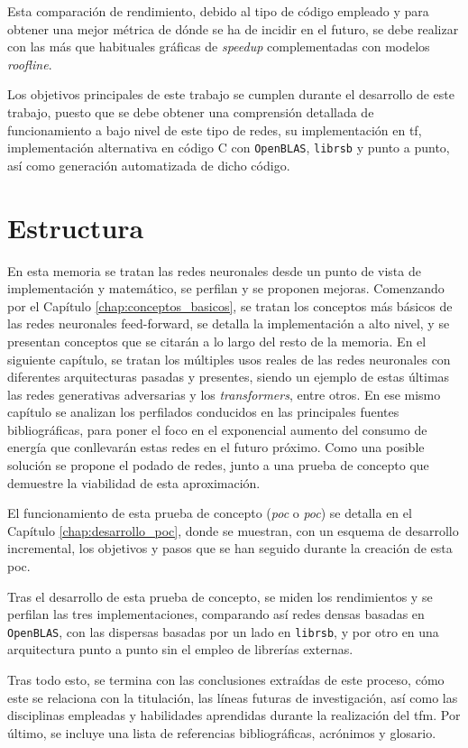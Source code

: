 Esta comparación de rendimiento, debido al tipo de código empleado y para obtener una mejor métrica de dónde se ha de incidir en el futuro, se debe realizar con las más que habituales gráficas de \textit{speedup} complementadas con modelos \textit{roofline}.

Los objetivos principales de este trabajo se cumplen durante el desarrollo de este trabajo, puesto que se debe obtener una comprensión detallada de funcionamiento a bajo nivel de este tipo de redes, su implementación en \acrlong{tf}, implementación alternativa en código C con \texttt{OpenBLAS}, \texttt{librsb} y punto a punto, así como generación automatizada de dicho código.

\section{Estructura}
\label{sec:estructura}
En esta memoria se tratan las redes neuronales desde un punto de vista de implementación y matemático, se perfilan y se proponen mejoras. Comenzando por el Capítulo \ref{chap:conceptos_basicos}, se tratan los conceptos más básicos de las redes neuronales feed-forward, se detalla la implementación a alto nivel, y se presentan conceptos que se citarán a lo largo del resto de la memoria. En el siguiente capítulo, se tratan los múltiples usos reales de las redes neuronales con diferentes arquitecturas pasadas y presentes, siendo un ejemplo de estas últimas las redes generativas adversarias y los \textit{transformers}, entre otros. En ese mismo capítulo se analizan los perfilados conducidos en las principales fuentes bibliográficas, para poner el foco en el exponencial aumento del consumo de energía que conllevarán estas redes en el futuro próximo. Como una posible solución se propone el podado de redes, junto a una prueba de concepto que demuestre la viabilidad de esta aproximación.

El funcionamiento de esta prueba de concepto (\textit{\acrlong{poc}} o \textit{\acrshort{poc}}) se detalla en el Capítulo \ref{chap:desarrollo_poc}, donde se muestran, con un esquema de desarrollo incremental, los objetivos y pasos que se han seguido durante la creación de esta \acrshort{poc}.

Tras el desarrollo de esta prueba de concepto, se miden los rendimientos y se perfilan las tres implementaciones, comparando así redes densas basadas en \texttt{OpenBLAS}, con las dispersas basadas por un lado en \texttt{librsb}, y por otro en una arquitectura punto a punto sin el empleo de librerías externas.

Tras todo esto, se termina con las conclusiones extraídas de este proceso, cómo este se relaciona con la titulación, las líneas futuras de investigación, así como las disciplinas empleadas y habilidades aprendidas durante la realización del \acrshort{tfm}. Por último, se incluye una lista de referencias bibliográficas, acrónimos y glosario.

